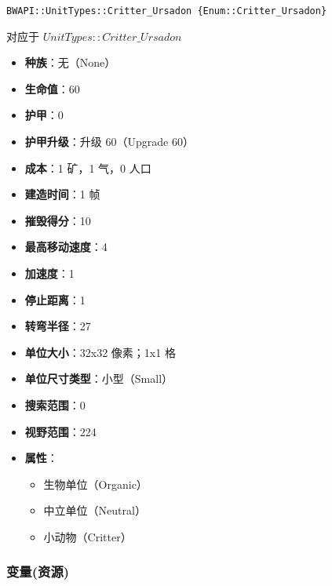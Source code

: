 \begin{tcolorbox}[colback=white, colframe=black!60!white, title=Critter\_Ursadon(), arc=0mm]
    \begin{verbatim}
BWAPI::UnitTypes::Critter_Ursadon {Enum::Critter_Ursadon}
    \end{verbatim}
    对应于  $UnitTypes::Critter\_Ursadon$ 
    \begin{itemize}
        \item \textbf{种族}：无（None）
        \item \textbf{生命值}：60
        \item \textbf{护甲}：0
        \item \textbf{护甲升级}：升级 60（Upgrade 60）
        \item \textbf{成本}：1 矿，1 气，0 人口
        \item \textbf{建造时间}：1 帧
        \item \textbf{摧毁得分}：10
        \item \textbf{最高移动速度}：4
        \item \textbf{加速度}：1
        \item \textbf{停止距离}：1
        \item \textbf{转弯半径}：27
        \item \textbf{单位大小}：32x32 像素；1x1 格
        \item \textbf{单位尺寸类型}：小型（Small）
        \item \textbf{搜索范围}：0
        \item \textbf{视野范围}：224
        \item \textbf{属性}：
            \begin{itemize}
                \item 生物单位（Organic）
                \item 中立单位（Neutral）
                \item 小动物（Critter）
            \end{itemize}
    \end{itemize}
\end{tcolorbox}

\subsubsection{变量(资源)}

